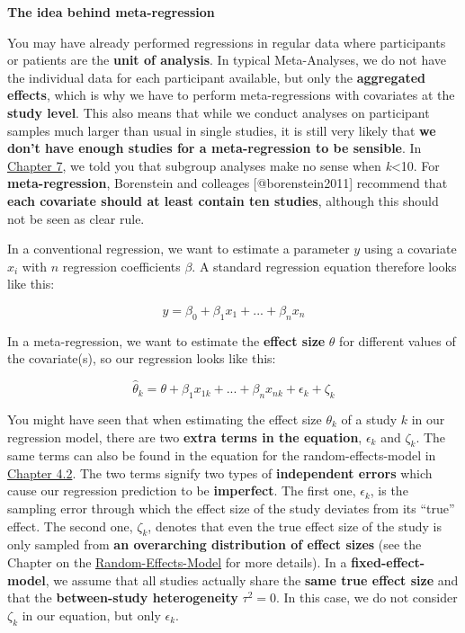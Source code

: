 \documentclass[]{book}
\begin{document}
\begin{rmdinfo}
\textbf{The idea behind meta-regression}

You may have already performed regressions in regular data where
participants or patients are the \textbf{unit of analysis}. In typical
Meta-Analyses, we do not have the individual data for each participant
available, but only the \textbf{aggregated effects}, which is why we
have to perform meta-regressions with covariates at the \textbf{study
level}. This also means that while we conduct analyses on participant
samples much larger than usual in single studies, it is still very
likely that \textbf{we don't have enough studies for a meta-regression
to be sensible}. In \protect\hyperlink{subgroup}{Chapter 7}, we told you
that subgroup analyses make no sense when \emph{k}\textless{}10. For
\textbf{meta-regression}, Borenstein and colleages {[}@borenstein2011{]}
recommend that \textbf{each covariate should at least contain ten
studies}, although this should not be seen as clear rule.

In a conventional regression, we want to estimate a parameter \(y\)
using a covariate \(x_i\) with \(n\) regression coefficients \(\beta\).
A standard regression equation therefore looks like this:

\[y=\beta_0 + \beta_1x_1 + ...+\beta_nx_n\]

In a meta-regression, we want to estimate the \textbf{effect size}
\(\theta\) for different values of the covariate(s), so our regression
looks like this:

\[\hat \theta_k = \theta + \beta_1x_{1k} + ... + \beta_nx_{nk} + \epsilon_k + \zeta_k\]

You might have seen that when estimating the effect size \(\theta_k\) of
a study \(k\) in our regression model, there are two \textbf{extra terms
in the equation}, \(\epsilon_k\) and \(\zeta_k\). The same terms can
also be found in the equation for the random-effects-model in
\protect\hyperlink{random}{Chapter 4.2}. The two terms signify two types
of \textbf{independent errors} which cause our regression prediction to
be \textbf{imperfect}. The first one, \(\epsilon_k\), is the sampling
error through which the effect size of the study deviates from its
``true'' effect. The second one, \(\zeta_k\), denotes that even the true
effect size of the study is only sampled from \textbf{an overarching
distribution of effect sizes} (see the Chapter on the
\protect\hyperlink{random}{Random-Effects-Model} for more details). In a
\textbf{fixed-effect-model}, we assume that all studies actually share
the \textbf{same true effect size} and that the \textbf{between-study
heterogeneity} \(\tau^2 = 0\). In this case, we do not consider
\(\zeta_k\) in our equation, but only \(\epsilon_k\).


\end{rmdinfo}
\end{document}
